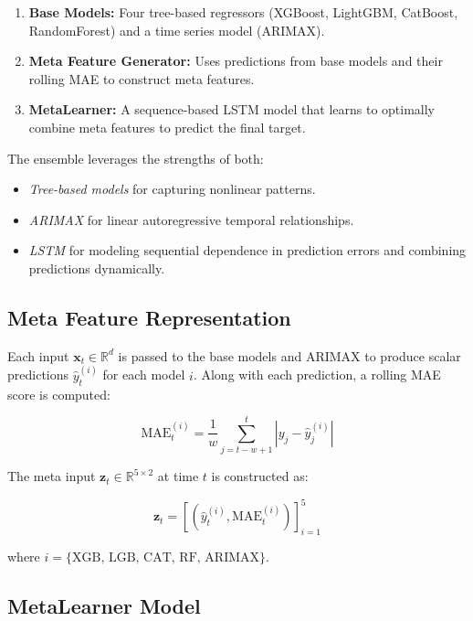 \begin{enumerate}
    \item \textbf{Base Models:} Four tree-based regressors (XGBoost, LightGBM, CatBoost, RandomForest) and a time series model (ARIMAX).
    \item \textbf{Meta Feature Generator:} Uses predictions from base models and their rolling MAE to construct meta features.
    \item \textbf{MetaLearner:} A sequence-based LSTM model that learns to optimally combine meta features to predict the final target.
\end{enumerate}

The ensemble leverages the strengths of both:
\begin{itemize}
    \item \textit{Tree-based models} for capturing nonlinear patterns.
    \item \textit{ARIMAX} for linear autoregressive temporal relationships.
    \item \textit{LSTM} for modeling sequential dependence in prediction errors and combining predictions dynamically.
\end{itemize}

\subsection{Meta Feature Representation}

Each input $\mathbf{x}_t \in \mathbb{R}^{d}$ is passed to the base models and ARIMAX to produce scalar predictions $\hat{y}_{t}^{(i)}$ for each model $i$. Along with each prediction, a rolling MAE score is computed:

\begin{equation}
\text{MAE}_{t}^{(i)} = \frac{1}{w} \sum_{j=t-w+1}^{t} \left| y_j - \hat{y}_j^{(i)} \right|
\end{equation}

The meta input $\mathbf{z}_t \in \mathbb{R}^{5 \times 2}$ at time $t$ is constructed as:

\begin{equation}
\mathbf{z}_t = \left[ \left( \hat{y}_t^{(i)}, \text{MAE}_t^{(i)} \right) \right]_{i=1}^5
\end{equation}

where $i = \{ \text{XGB, LGB, CAT, RF, ARIMAX} \}$.

\subsection{MetaLearner Model}

